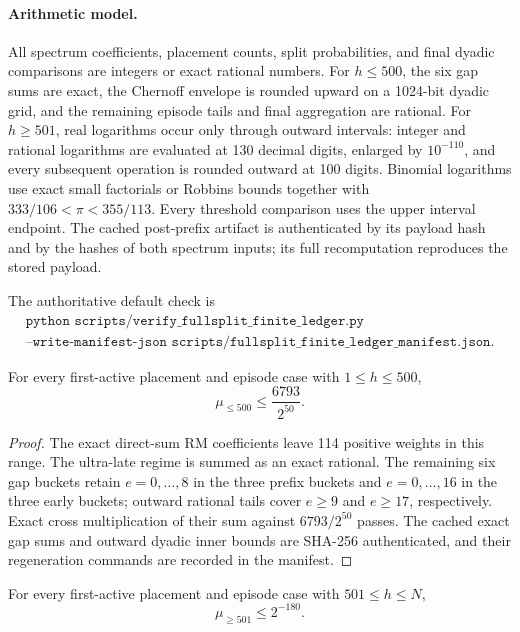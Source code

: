 \paragraph{Arithmetic model.}
All spectrum coefficients, placement counts, split probabilities, and final
dyadic comparisons are integers or exact rational numbers.  For \(h\le500\),
the six gap sums are exact, the Chernoff envelope is rounded upward on a
1024-bit dyadic grid, and the remaining episode tails and final aggregation
are rational.  For \(h\ge501\), real logarithms occur only through outward
intervals: integer and rational logarithms are evaluated at 130 decimal
digits, enlarged by \(10^{-110}\), and every subsequent operation is rounded
outward at 100 digits.  Binomial logarithms use exact small factorials or
Robbins bounds together with \(333/106<\pi<355/113\).  Every threshold
comparison uses the upper interval endpoint.  The cached post-prefix artifact
is authenticated by its payload hash and by the hashes of both spectrum
inputs; its full recomputation reproduces the stored payload.

The authoritative default check is
\[
\begin{gathered}
\texttt{python scripts/verify\_fullsplit\_finite\_ledger.py}\\
\texttt{--write-manifest-json scripts/fullsplit\_finite\_ledger\_manifest.json}.
\end{gathered}
\]

\begin{lemma}
\label{lem:fullsplit-rm-ebch-low-rational}
For every first-active placement and episode case with \(1\le h\le500\),
\[
 \mu_{\le500}\le \frac{6793}{2^{50}}.
\]
\end{lemma}

\begin{proof}
The exact direct-sum RM coefficients leave 114 positive weights in this range.
The ultra-late regime is summed as an exact rational.  The remaining six gap
buckets retain \(e=0,\ldots,8\) in the three prefix buckets and
\(e=0,\ldots,16\) in the three early buckets; outward rational tails cover
\(e\ge9\) and \(e\ge17\), respectively.  Exact cross multiplication of their
sum against \(6793/2^{50}\) passes.  The cached exact gap sums and outward
dyadic inner bounds are SHA-256 authenticated, and their regeneration commands
are recorded in the manifest.
\end{proof}

\begin{lemma}
\label{lem:fullsplit-rm-ebch-high-rational}
For every first-active placement and episode case with \(501\le h\le N\),
\[
 \mu_{\ge501}\le 2^{-180}.
\]
\end{lemma}

